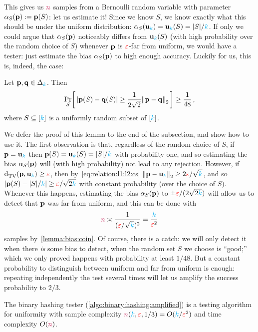 This gives us ${\textcolor{purple}{n}}$ \iid samples from a Bernoulli random variable with parameter $\alpha_S(\mathbf{p}) := \mathbf{p}(S)$: let us estimate it! Since we know $S$, we know exactly what this should be under the uniform distribution: $\alpha_S(\uniform_\ab) = \uniform_\ab(S) = \abs{S}/\ab$. If only we could argue that $\alpha_S(\mathbf{p})$ noticeably differs from $\mathbf{u}_{\textcolor{cyan}{k}}(S)$ (with high probability over the random choice of $S$) whenever $\mathbf{p}$ is $\textcolor{red}{\varepsilon}$-far from uniform, we would have a tester: just estimate the bias $\alpha_S(\mathbf{p})$ to high enough accuracy. Luckily for us, this is, indeed, the case:
\begin{lemma}
  \label{lemma:random:binary:hashing}
  Let $\mathbf{p},\mathbf{q}\in\Delta_{{\textcolor{cyan}{k}}}$. Then
  \[
        \probaDistrOf{S}{ |\p(S)-\q(S)| \geq \frac{1}{2\sqrt{2}}\normtwo{\p-\q} } \geq \frac{1}{48}\,,
  \] 
  where $S\subseteq[{\textcolor{cyan}{k}}]$ is a uniformly random subset of $[{\textcolor{cyan}{k}}]$.
\end{lemma}
We defer the proof of this lemma to the end of the subsection, and show how to use it. The first observation is that, regardless of the random choice of $S$, if $\mathbf{p}=\mathbf{u}_{\textcolor{cyan}{k}}$ then $\mathbf{p}(S) = \mathbf{u}_{\textcolor{cyan}{k}}(S) = |S|/{\textcolor{cyan}{k}}$ with probability one, and so estimating the bias $\alpha_S(\mathbf{p})$ will (with high probability) not lead to any rejection. However, if $\totalvardist{\p}{\uniform_\ab}\geq \dst$, then by~\cref{eq:relation:l1:l2:cs} $\normtwo{\p-\uniform_\ab} \geq 2\dst/\sqrt{\ab}$, and so 
$|\mathbf{p}(S)-|S|/{\textcolor{cyan}{k}}| \geq \textcolor{red}{\varepsilon}/\sqrt{2{\textcolor{cyan}{k}}}$ with constant probability (over the choice of $S$). Whenever this happens, estimating the bias $\alpha_S(\mathbf{p})$ to $\pm \textcolor{red}{\varepsilon}/(2\sqrt{2{\textcolor{cyan}{k}}})$ will allow us to detect that $\mathbf{p}$ was far from uniform, and this can be done with
\[
    {\textcolor{purple}{n}} \asymp \frac{1}{(\textcolor{red}{\varepsilon}/\sqrt{{\textcolor{cyan}{k}}})^2} = \frac{{\textcolor{cyan}{k}}}{\textcolor{red}{\varepsilon}^2}
\]
samples by~\cref{lemma:bias:coin}. Of course, there is a catch: we will only detect it when there \emph{is} some bias to detect, \ie when the random set $S$ we choose is ``good;'' which we only proved happens with probability at least $1/48$. But a constant probability to distinguish between uniform and far from uniform is enough: repeating independently the test several times will let us amplify the success probability to $2/3$.
\begin{theorem}
The binary hashing tester (\cref{algo:binary:hashing:amplified}) is a testing algorithm for uniformity with sample complexity ${\textcolor{purple}{n}}({\textcolor{cyan}{k}},\textcolor{red}{\varepsilon},1/3) = O({\textcolor{cyan}{k}}/\textcolor{red}{\varepsilon}^2)$ and time complexity $O({\textcolor{purple}{n}})$.
\end{theorem}
